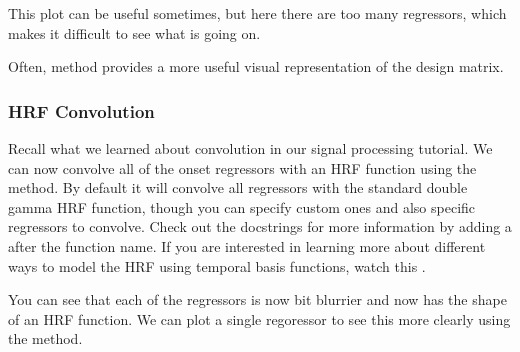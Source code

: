 \documentclass[letterpaper,10pt,english]{sphinxmanual}
\begin{document}
This plot can be useful sometimes, but here there are too many regressors, which makes it difficult to see what is going on.

Often,   method provides a more useful visual representation of the design matrix.

\begin{sphinxVerbatim}[commandchars=\\\{\}]
\end{sphinxVerbatim}

\noindent{}


\subsubsection{HRF Convolution}
\label{\detokenize{content/GLM_Single_Subject_Model:hrf-convolution}}
Recall what we learned about convolution in our signal processing tutorial. We can now convolve all of the onset regressors with an HRF function using the  method. By default it will convolve all regressors with the standard double gamma HRF function, though you can specify custom ones and also specific regressors to convolve. Check out the docstrings for more information by adding a  after the function name. If you are interested in learning more about different ways to model the HRF using temporal basis functions, watch this .

\begin{sphinxVerbatim}[commandchars=\\\{\}]
  
\end{sphinxVerbatim}

\noindent{}

You can see that each of the regressors is now  bit blurrier and now has the shape of an HRF function. We can plot a single regoressor to see this more clearly using the  method.

\begin{sphinxVerbatim}[commandchars=\\\{\}]
  
\PYG{p}{[}\PYG{p}{]}
\end{sphinxVerbatim}
\end{document}
